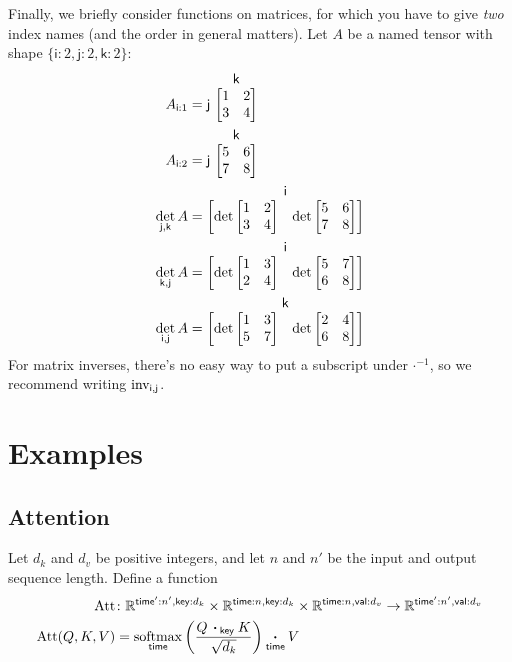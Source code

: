 \documentclass{article}
\makeatletter
\newcommand{\name}[1]{\mathsf{#1}}
\newcommand{\ndot}[1]{\mathbin{\mathop{\thinspace\boldsymbol\cdot\thinspace}\displaylimits_{\name{#1}}}}
\DeclareMathOperator*{\softmax}{softmax}
\newcommand{\namedmatrix}[3]{%
\ifx #1\end\end \else #1\ \fi
\begin{array}[b]{@{}c@{}} \smash{#2} \\ \begin{bmatrix} #3 \end{bmatrix} \end{array}
}
\makeatother
\begin{document}
Finally, we briefly consider functions on matrices, for which you have to give \emph{two} index names (and the order in general matters). Let $A$ be a named tensor with shape $\{\name{i}:2,\name{j}:2,\name{k}:2\}$:
\begin{align*}
A_{\name{i}:1} &= \namedmatrix{\name{j}}{\name{k}}{
  1 & 2 \\
  3 & 4
} \\
A_{\name{i}:2} &= \namedmatrix{\name{j}}{\name{k}}{
  5 & 6 \\
  7 & 8
} \\
\det_{\name{j},\name{k}} A &= \namedmatrix{}{\name{i}}{\det \begin{bmatrix} 1 & 2 \\ 3 & 4 \end{bmatrix} & \det \begin{bmatrix} 5 & 6 \\ 7 & 8 \end{bmatrix}} \\
\det_{\name{k},\name{j}} A &= \namedmatrix{}{\name{i}}{\det \begin{bmatrix} 1 & 3 \\ 2 & 4 \end{bmatrix} & \det \begin{bmatrix} 5 & 7 \\ 6 & 8 \end{bmatrix}} \\
\det_{\name{i},\name{j}} A &= \namedmatrix{}{\name{k}}{\det \begin{bmatrix} 1 & 3 \\ 5 & 7 \end{bmatrix} & \det \begin{bmatrix} 2 & 4 \\ 6 & 8 \end{bmatrix}}
\end{align*}
For matrix inverses, there's no easy way to put a subscript under $\mathord\cdot^{-1}$, so we recommend writing $\mathop{\text{inv}}\displaylimits_{\name{i},\name{j}}$.

\section{Examples}
\label{sec:examples}

\subsection{Attention}

Let $d_k$ and $d_v$ be positive integers, and let $n$ and $n'$ be the input and output sequence length. Define a function
\begin{align*}
  \text{Att} &\colon \mathbb{R}^{\name{time'}:n',\name{key}:d_k} \times \mathbb{R}^{\name{time}:n,\name{key}:d_k} \times \mathbb{R}^{\name{time}:n,\name{val}:d_v} \rightarrow \mathbb{R}^{\name{time'}:n',\name{val}:d_v} \\
  \text{Att}(Q,K,V) &= \softmax_{\name{time}} \left( \frac{Q \ndot{key} K}{\sqrt{d_k}} \right) \ndot{time} V
\end{align*}
\end{document}
